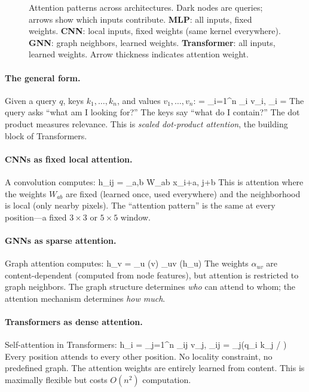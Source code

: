 \documentclass[11pt]{article}
\begin{document}
\begin{figure}[h]
\centering

\caption{Attention patterns across architectures. Dark nodes are queries; arrows show which inputs contribute. \textbf{MLP}: all inputs, fixed weights. \textbf{CNN}: local inputs, fixed weights (same kernel everywhere). \textbf{GNN}: graph neighbors, learned weights. \textbf{Transformer}: all inputs, learned weights. Arrow thickness indicates attention weight.}
\label{fig:attention_patterns}
\end{figure}

\paragraph{The general form.} Given a query $q$, keys $k_1, \ldots, k_n$, and values $v_1, \ldots, v_n$:
\beq
{} = \sum_{i=1}^n \alpha_i \cdot v_i, \quad {} \quad \alpha_i = 
\eeq
The query asks ``what am I looking for?'' The keys say ``what do I contain?'' The dot product measures relevance. This is \emph{scaled dot-product attention}, the building block of Transformers.

\paragraph{CNNs as fixed local attention.} A convolution computes:
\beq
h_{ij} = \sum_{a,b} W_{ab} \cdot x_{i+a, j+b}
\eeq
This is attention where the weights $W_{ab}$ are fixed (learned once, used everywhere) and the neighborhood is local (only nearby pixels). The ``attention pattern'' is the same at every position---a fixed $3 \times 3$ or $5 \times 5$ window.

\paragraph{GNNs as sparse attention.} Graph attention computes:
\beq
h_v = \sum_{u \in {}(v)} \alpha_{uv} \cdot \psi(h_u)
\eeq
The weights $\alpha_{uv}$ are content-dependent (computed from node features), but attention is restricted to graph neighbors. The graph structure determines \emph{who} can attend to whom; the attention mechanism determines \emph{how much}.

\paragraph{Transformers as dense attention.} Self-attention in Transformers:
\beq
h_i = \sum_{j=1}^n \alpha_{ij} \cdot v_j, \quad \alpha_{ij} = _j(q_i \cdot k_j / )
\eeq
Every position attends to every other position. No locality constraint, no predefined graph. The attention weights are entirely learned from content. This is maximally flexible but costs $O(n^2)$ computation.
\end{document}
